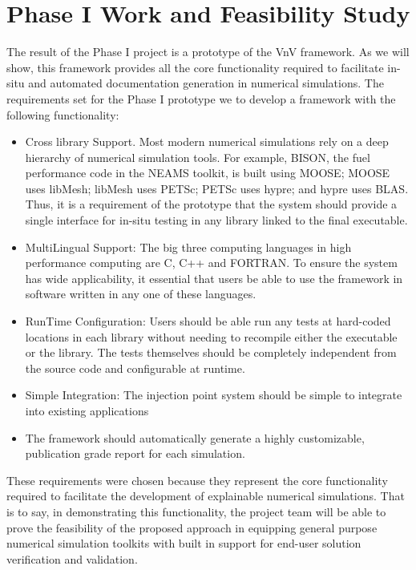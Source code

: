 \section{Phase I Work and Feasibility Study}

The result of the Phase I project is a prototype of the VnV framework. As we will show,
this framework provides all the core functionality required to facilitate in-situ \VV and automated 
documentation generation in numerical simulations. The requirements set for the Phase I prototype we to develop a framework 
with the following functionality:

\begin{itemize}
 \item Cross library Support. Most modern numerical simulations rely on a deep hierarchy of numerical simulation tools. For example, BISON, the fuel performance code in the NEAMS toolkit, is built using MOOSE; MOOSE uses libMesh; libMesh uses PETSc; PETSc uses hypre; and hypre uses BLAS. Thus, it is a requirement of the prototype that the system should provide a single interface for in-situ testing in any library linked to the final executable. 
 \item MultiLingual Support: The big three computing languages in high performance computing are C, C++ and FORTRAN. To ensure the system has wide applicability, it essential that users be able to use the framework in software written in any one of these languages. 
 \item RunTime Configuration: Users should be able run any \VV tests at hard-coded locations in each library without needing to recompile either the executable or the library. The tests themselves should be completely independent from the source code and configurable at runtime. 
 \item Simple Integration: The injection point system should be simple to integrate into existing applications
 \item The framework should automatically generate a highly customizable, publication grade \VV report for each simulation. 
\end{itemize}

These requirements were chosen because they represent the core functionality required to facilitate the development of explainable numerical simulations. That is to say,
in demonstrating this functionality, the project team will be able to prove the feasibility of the proposed approach in equipping general purpose numerical simulation toolkits 
with built in support for end-user solution verification and validation. 

